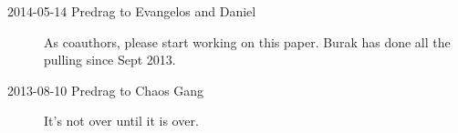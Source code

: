 \begin{description}
\item[2014-05-14 Predrag to Evangelos and Daniel] As coauthors, please start
working on this paper. Burak has done all the pulling since Sept 2013.








\item[2013-08-10  Predrag to Chaos Gang] It's not over until it is over.

\end{description}
